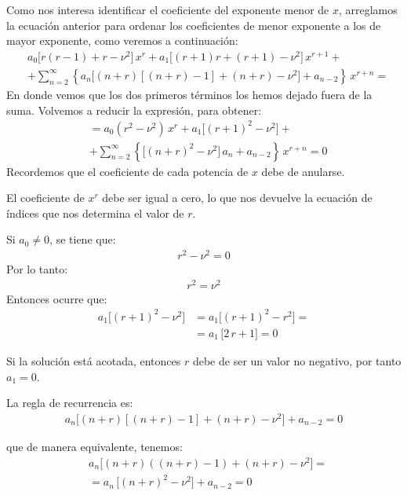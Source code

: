 Como nos interesa identificar el coeficiente del exponente menor de $x$, arreglamos la ecuación anterior para ordenar los coeficientes de menor exponente a los de mayor exponente, como veremos a continuación:
\begin{align*}
&a_{0} \bigg[ r (r - 1) + r - \nu^{2} \bigg] \, x^{r} + a_{1} \bigg[ (r + 1) r + (r + 1) - \nu^{2} \bigg] \, x^{r+1} + \\[0.5em]
&+ \sum_{n=2}^{\infty} \left\{ a_{n} \bigg[ (n + r) \left[ (n + r) - 1 \right] + (n + r) - \nu^{2} \bigg] + a_{n-2} \right\} \, x^{r+n} =
\end{align*}
En donde vemos que los dos primeros términos los hemos dejado fuera de la suma. Volvemos a reducir la expresión, para obtener:
\begin{align*}
&= a_{0} (r^{2} - \nu^{2}) \, x^{r} + a_{1} \bigg[ (r + 1)^{2} - \nu^{2} \bigg] + \\[0.5em]
&+ \sum_{n=2}^{\infty} \left\{ \bigg[ (n + r)^{2} - \nu^{2} \bigg] \, a_{n} + a_{n-2} \right\} \, x^{r+n} = 0
\end{align*}
Recordemos que el coeficiente de cada potencia de $x$ debe de anularse.
\par
El coeficiente de $x^{r}$ debe ser igual a cero, lo que nos devuelve la ecuación de índices que nos determina el valor de $r$.
\par
Si $a_{0} \neq 0$, se tiene que:
\begin{align*}
r^{2} - \nu^{2} = 0
\end{align*}
Por lo tanto:
\begin{align*}
r^{2} = \nu^{2}
\end{align*}
Entonces ocurre que:
\begin{align*}
a_{1} \big[ (r + 1)^{2} - \nu^{2} \big] &= a_{1} \big[ (r + 1)^{2} - r^{2} \big] = \\[0.5em]
&= a_{1} \, \big[ 2 \, r + 1 \big] = 0
\end{align*}

Si la solución está acotada, entonces $r$ debe de ser un valor no negativo, por tanto $a_{1} = 0$.

La regla de recurrencia es:
\begin{align*}
a_{n} \big[ (n + r) \left[ (n + r) - 1 \right] + (n + r) - \nu^{2} \big] + a_{n-2} = 0
\end{align*}

que de manera equivalente, tenemos:
\begin{align*}
&a_{n} \big[ (n + r) \left( (n + r) - 1 \right) + (n + r) - \nu^{2} \big] = \\[0.5em]
&= a_{n} \, \big[ (n + r)^{2} - \nu^{2} \big] + a_{n-2} = 0
\end{align*}

